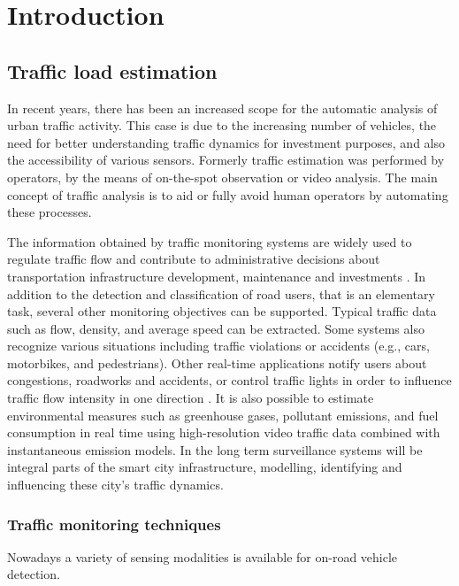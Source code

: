 \chapter*{Introduction}
\section{Traffic load estimation}
In recent years, there has been an increased scope for the automatic analysis of urban traffic activity\cite{Buch2011}.
This case is due to the increasing number of vehicles, the need for better understanding traffic dynamics for investment purposes, and also the accessibility of various sensors.
Formerly traffic estimation was performed by operators, by the means of on-the-spot observation or video analysis.
The main concept of traffic analysis is to aid or fully avoid human operators by automating these processes.

The information obtained by traffic monitoring systems are widely used to regulate traffic flow and contribute to administrative decisions about transportation infrastructure development, maintenance and investments \cite{MagyarKozut}.
In addition to the detection and classification of road users, that is an elementary task, several other monitoring objectives can be supported. 
Typical traffic data such as flow, density, and average speed can be extracted.
Some systems also recognize various situations including traffic violations or accidents (e.g., cars, motorbikes, and pedestrians).
Other real-time applications notify users about congestions, roadworks and accidents, or control traffic lights in order to influence traffic flow intensity in one direction \cite{AzoSensor, Thiruverahan2015, Ghazal2016}.
It is also possible to estimate environmental measures such as greenhouse gases, pollutant emissions, and fuel consumption in real time using high-resolution video traffic data combined with instantaneous emission models\cite{Morris2012a}. 
In the long term surveillance systems will be integral parts of the smart city infrastructure, modelling, identifying and influencing these city's traffic dynamics\cite{SOLSUN}.

\subsection{Traffic monitoring techniques}
Nowadays a variety of sensing modalities is available for on-road vehicle detection.

